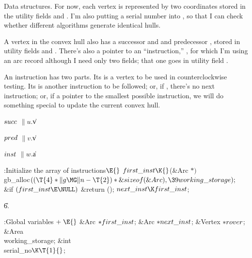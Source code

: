 Data structures.
For now, each vertex is represented by two coordinates stored in the
utility fields  and . I'm also putting a serial
number into
, so that I can check whether different algorithms generate
identical hulls.

A vertex  in the convex hull also has a successor 
and
and predecessor , stored in utility fields  and %
.
There's also a pointer to an ``instruction,'' , for which
I'm
using an arc record although I need only two fields; that one goes in
utility field .

An instruction has two parts. Its  is a vertex to be used in
counterclockwise testing. Its  is another instruction to be
followed;
or, if \PB{$\NULL$}, there's no next instruction; or, if a pointer to the
smallest possible instruction, we will do something special to update
the current convex hull.

\Y\B\4\D$\\{succ}$ \5
$\|u.{}$\|v\par
\B\4\D$\\{pred}$ \5
$\|v.{}$\|v\par
\B\4\D$\\{inst}$ \5
$\|w.{}$\|a\par
\fi

\B{}:Initialize the array of instructions\X${}\E{}$\6
$\\{first\_inst}\K{}$(\&{Arc} ${}{*}){}$ \\{gb\_alloc}${}((\T{4}*\|g\MG\|n-%
\T{2})*\&{sizeof}(\&{Arc}),\39\\{working\_storage});{}$\6
\&{if} ${}(\\{first\_inst}\E\NULL){}$\1\5
\&{return} ();\2\6
${}\\{next\_inst}\K\\{first\_inst}{}$;\par
\U6.\fi

\B{}:Global variables\X${}\mathrel+\E{}$\6
\&{Arc} ${}{*}\\{first\_inst}{}$;\6
\&{Arc} ${}{*}\\{next\_inst}{}$;\6
\&{Vertex} ${}{*}\\{rover}{}$;\6
\&{Area} \\{working\_storage};\6
\&{int} \\{serial\_no}${}\K\T{1}{}$;\par
\fi

